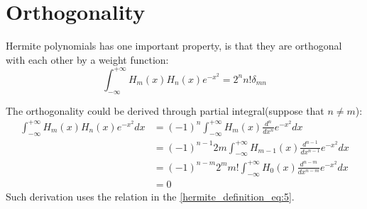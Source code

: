 \section{Orthogonality} 
%
%
%
Hermite polynomials has one important property, is that they are orthogonal with 
each other by a weight function:
\begin{equation}
\label{hermite_orthogonality_eq:1}
 \int^{+\infty}_{-\infty} H_{m}(x)H_{n}(x)e^{-x^{2}} = 
 2^{n}n!\delta_{mn}  
\end{equation}

The orthogonality could be derived through partial integral(suppose that $n\neq m$):
\begin{align}
 \label{hermite_orthogonality_eq:2}
 \int^{+\infty}_{-\infty} H_{m}(x)H_{n}(x)e^{-x^{2}} dx &= 
(-1)^{n} \int^{+\infty}_{-\infty} H_{m}(x) \frac{d^{n}}{dx^{n}}e^{-x^{2}}dx \nonumber \\
&=  (-1)^{n-1} 2m\int^{+\infty}_{-\infty} H_{m-1}(x)\frac{d^{n-1}}{dx^{n-1}}e^{-x^{2}}dx 
\nonumber \\
&= (-1)^{n-m} 2^{m}m!\int^{+\infty}_{-\infty} H_{0}(x)\frac{d^{n-m}}{dx^{n-m}}e^{-x^{2}}dx 
\nonumber \\
&= 0
\end{align}
Such derivation uses the relation in the \ref{hermite_definition_eq:5}.
 

